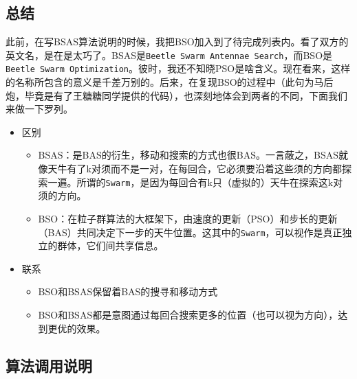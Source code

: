 \documentclass[]{ctexbook}
\providecommand{\tightlist}{%
  \setlength{\itemsep}{0pt}\setlength{\parskip}{0pt}}
\begin{document}
\subsection{总结}

此前，在写BSAS算法说明的时候，我把BSO加入到了待完成列表内。看了双方的英文名，是在是太巧了。BSAS是\texttt{Beetle\ Swarm\ Antennae\ Search}，而BSO是\texttt{Beetle\ Swarm\ Optimization}。彼时，我还不知晓PSO是啥含义。现在看来，这样的名称所包含的意义是千差万别的。后来，在复现BSO的过程中（此句为马后炮，毕竟是有了王糖糖同学提供的代码），也深刻地体会到两者的不同，下面我们来做一下罗列。

\begin{itemize}
\tightlist
\item
  区别

  \begin{itemize}
  \tightlist
  \item
    BSAS：是BAS的衍生，移动和搜索的方式也很BAS。一言蔽之，BSAS就像天牛有了k对须而不是一对，在每回合，它必须要沿着这些须的方向都探索一遍。所谓的\texttt{Swarm}，是因为每回合有k只（虚拟的）天牛在探索这k对须的方向。
  \item
    BSO：在粒子群算法的大框架下，由速度的更新（PSO）和步长的更新（BAS）共同决定下一步的天牛位置。这其中的\texttt{Swarm}，可以视作是真正独立的群体，它们间共享信息。
  \end{itemize}
\item
  联系

  \begin{itemize}
  \tightlist
  \item
    BSO和BSAS保留着BAS的搜寻和移动方式
  \item
    BSO和BSAS都是意图通过每回合搜索更多的位置（也可以视为方向），达到更优的效果。
  \end{itemize}
\end{itemize}

\subsection{算法调用说明}\label{BSOparms}
\end{document}
